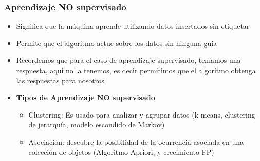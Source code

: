 \documentclass[10pt]{beamer}
\begin{document}
\begin{frame}
\frametitle{Aprendizaje NO supervisado}
\begin{beamerboxesrounded}[upper=uppercolor, lower=lowercolor, shadow=true]{} 

\begin{itemize}
 \item Significa que la m\'aquina aprende utilizando datos insertados sin etiquetar
 \item Permite que el algoritmo actue sobre los datos sin ninguna gu\'ia
 \item Recordemos que para el caso de aprendizaje supervisado, ten\'iamos una respuesta, aqu\'i no la tenemos, es decir permitimos que el algoritmo obtenga las respuestas para nosotros
 \item \textbf{Tipos de Aprendizaje NO supervisado} 
 \begin{itemize}
   \item Clustering: Es usado para analizar y agrupar datos (k-means, clustering de jerarqu\'ia, modelo escondido de Markov)
   \item Asociaci\'on: descubre la posibilidad de la ocurrencia asociada  en una colecci\'on de objetos (Algoritmo Apriori, y crecimiento-FP)
 \end{itemize}
  
\end{itemize}
\end{beamerboxesrounded}

\begin{columns}

\hspace{5mm}
\hspace{5mm}
\begin{column}{\textwidth}
 \begin{figure}
 \end{figure}
\end{column}%

\begin{column}{.33\textwidth}
 \begin{figure}
 \end{figure}  
\end{column}%

\end{columns}

\end{frame}
\end{document}
